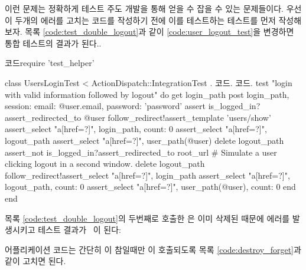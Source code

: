 {{이런 문제는 정확하게 테스트 주도 개발을 통해 얻을 수 잡을 수 있는 문제들이다. 우선 이 두개의 에러를 고치는 코드를 작성하기 전에 이를 테스트하는 테스트를 먼저 작성해보자. 목록 \ref{code:test_double_logout}과 같이 \ref{code:user_logout_test}을 변경하면 통합 테스트의 결과가  된다.. 

\begin{codelisting} \label{code:test_double_logout}  

\begin{code} 코드require 'test_helper' 

class UsersLoginTest < ActionDispatch::IntegrationTest . 코드. 코드. test "login with valid information followed by logout" do get login_path post login_path, session: { email: @user.email, password: 'password' } assert is_logged_in?assert_redirected_to @user follow_redirect!assert_template 'users/show' assert_select "a[href=?]", login_path, count: 0 assert_select "a[href=?]", logout_path assert_select "a[href=?]", user_path(@user) delete logout_path assert_not is_logged_in?assert_redirected_to root_url # Simulate a user clicking logout in a second window. delete logout_path follow_redirect!assert_select "a[href=?]", login_path assert_select "a[href=?]", logout_path, count: 0 assert_select "a[href=?]", user_path(@user), count: 0 end end \end{code} \end{codelisting} 

\noindent 목록 \ref{code:test_double_logout}의 두번째로 호출한 은 이미 삭제된 때문에 에러를 발생시키고 테스트 결과가 \failing\  이 된다: 

\begin{codelisting}  

 \end{codelisting} 

어플리케이션 코드는 간단히 이 참일때만 이 호출되도록 목록 \ref{code:destroy_forget}과 같이 고치면 된다. 

\begin{codelisting} \label{code:destroy_forget}  


\end{codelisting}}}
